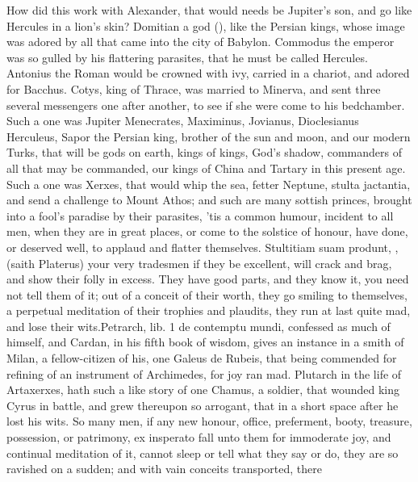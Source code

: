 {{How did this work with Alexander, that would needs be Jupiter's son,
and go like Hercules in a lion's skin? Domitian a god (), like the Persian kings, whose image
was adored by all that came into the city of Babylon. Commodus the
emperor was so gulled by his flattering parasites, that he must be
called Hercules. Antonius the Roman would be crowned with ivy,
carried in a chariot, and adored for Bacchus. Cotys, king of Thrace,
was married to  Minerva, and sent three several messengers one
after another, to see if she were come to his bedchamber. Such a one
was Jupiter Menecrates, Maximinus, Jovianus, Dioclesianus
Herculeus, Sapor the Persian king, brother of the sun and moon, and our
modern Turks, that will be gods on earth, kings of kings, God's shadow,
commanders of all that may be commanded, our kings of China and Tartary
in this present age. Such a one was Xerxes, that would whip the sea,
fetter Neptune, stulta jactantia, and send a challenge to Mount Athos;
and such are many sottish princes, brought into a fool's paradise by
their parasites, 'tis a common humour, incident to all men, when they
are in great places, or come to the solstice of honour, have done, or
deserved well, to applaud and flatter themselves. Stultitiam suam
produnt, \etc{}, (saith Platerus) your very tradesmen if they be
excellent, will crack and brag, and show their folly in excess. They
have good parts, and they know it, you need not tell them of it; out of
a conceit of their worth, they go smiling to themselves, a perpetual
meditation of their trophies and plaudits, they run at last quite mad,
and lose their wits.Petrarch, lib. 1 de contemptu mundi,
confessed as much of himself, and Cardan, in his fifth book of wisdom,
gives an instance in a smith of Milan, a fellow-citizen of his,
one Galeus de Rubeis, that being commended for refining of an
instrument of Archimedes, for joy ran mad. Plutarch in the life of
Artaxerxes, hath such a like story of one Chamus, a soldier, that
wounded king Cyrus in battle, and grew thereupon so arrogant,
that in a short space after he lost his wits. So many men, if any new
honour, office, preferment, booty, treasure, possession, or patrimony,
ex insperato fall unto them for immoderate joy, and continual
meditation of it, cannot sleep or tell what they say or do, they
are so ravished on a sudden; and with vain conceits transported, there
}}
